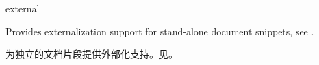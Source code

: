 














\begin{docTcbKey}[library]{external}{}{}

Provides externalization support for stand-alone document snippets,
see .

为独立的文档片段提供外部化支持。见。

\end{docTcbKey}













